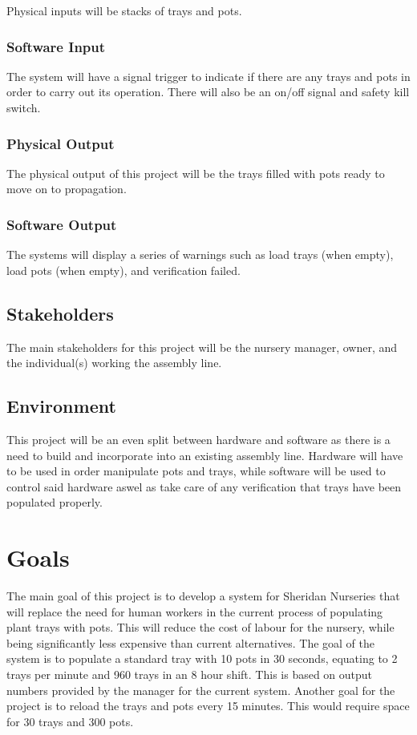 \documentclass{article}
\begin{document}
Physical inputs will be stacks of trays and pots.
\subsubsection{Software Input}
The system will have a signal trigger to indicate if there are any trays and pots in order to carry out its operation. 
There will also be an on/off signal and safety kill switch.
\subsubsection{Physical Output}
The physical output of this project will be the trays filled with pots ready to move on to propagation.
\subsubsection{Software Output}
The systems will display a series of warnings such as load trays (when empty), load pots (when empty), 
and verification failed.


\subsection{Stakeholders}
The main stakeholders for this project will be the nursery manager, 
owner, and the individual(s) working the assembly line.

\subsection{Environment}
This project will be an even split between hardware and software as there is a need to build and incorporate into an existing assembly line.
Hardware will have to be used in order manipulate pots and trays, while software will be used to control said hardware 
aswel as take care of any verification that trays have been populated properly.
\section{Goals}
The main goal of this project is to develop a system for Sheridan Nurseries
that will replace the need for human workers in the current process of populating plant trays with pots. This will reduce the cost
of labour for the nursery, while being significantly less expensive than current alternatives. The goal of the system is to populate 
a standard tray with 10 pots in 30 seconds, equating to 2 trays per minute and 960 trays in an 8 hour shift. This is based on output 
numbers provided by the manager for the current system. Another goal for the project is to reload the trays and pots every 15 minutes.
This would require space for 30 trays and 300 pots.
\end{document}
